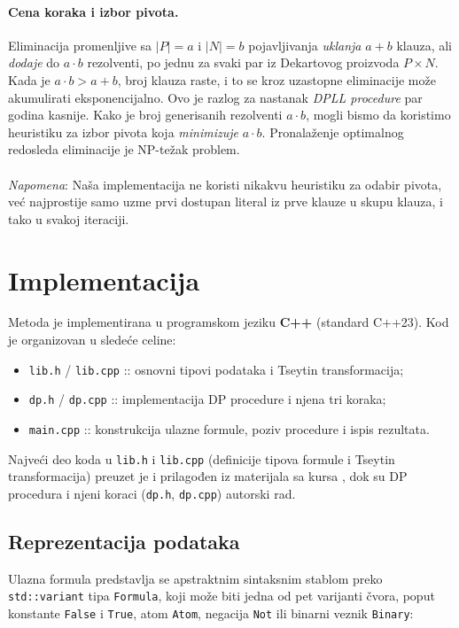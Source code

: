 \documentclass[a4paper,10pt]{article}
\begin{document}
\paragraph{Cena koraka i izbor pivota.} Eliminacija promenljive sa $|P| = a$ i $|N| = b$ pojavljivanja \emph{uklanja} $a + b$ klauza, ali \emph{dodaje} do $a \cdot b$ rezolventi, po jednu za svaki par iz Dekartovog proizvoda $P \times N$. Kada je $a \cdot b > a + b$, broj klauza raste, i to se kroz uzastopne eliminacije može akumulirati eksponencijalno. Ovo je razlog za nastanak \emph{DPLL procedure} par godina kasnije. Kako je broj generisanih rezolventi $a \cdot b$, mogli bismo da koristimo heuristiku za izbor pivota koja \emph{minimizuje} $a \cdot b$. Pronalaženje optimalnog redosleda eliminacije je NP-težak problem.
\\ \\
\emph{Napomena}: Naša implementacija ne koristi nikakvu heuristiku za odabir pivota, već najprostije samo uzme prvi dostupan literal iz prve klauze u skupu klauza, i tako u svakoj iteraciji.
\section{Implementacija}
\label{sec:implementacija}

Metoda je implementirana u programskom jeziku \textbf{C++} (standard C++23).
Kod je organizovan u sledeće celine:

\begin{itemize}
  \item \verb|lib.h| / \verb|lib.cpp| :: osnovni tipovi podataka i Tseytin transformacija;
  \item \verb|dp.h| / \verb|dp.cpp| :: implementacija DP procedure i njena tri koraka;
  \item \verb|main.cpp| :: konstrukcija ulazne formule, poziv procedure i ispis rezultata.
\end{itemize}

Najveći deo koda u \verb|lib.h| i \verb|lib.cpp| (definicije tipova formule i Tseytin transformacija) preuzet je i prilagođen iz materijala sa kursa \cite{ar_materijali}, dok su DP procedura i njeni koraci (\verb|dp.h|, \verb|dp.cpp|) autorski rad.

\subsection{Reprezentacija podataka}

Ulazna formula predstavlja se apstraktnim sintaksnim stablom preko
\verb|std::variant| tipa \verb|Formula|, koji može biti jedna od pet varijanti čvora, poput konstante \verb|False| i \verb|True|, atom
\verb|Atom|, negacija \verb|Not| ili binarni veznik \verb|Binary|:
\end{document}
